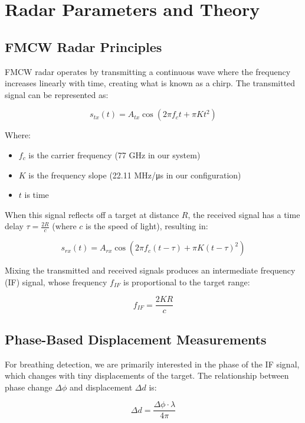 \documentclass[12pt]{article}
\begin{document}
\section{Radar Parameters and Theory}

\subsection{FMCW Radar Principles}
FMCW radar operates by transmitting a continuous wave where the frequency increases linearly with time, creating what is known as a chirp. The transmitted signal can be represented as:

\begin{equation}
s_{tx}(t) = A_{tx}\cos\left(2\pi f_c t + \pi K t^2\right)
\end{equation}

Where:
\begin{itemize}
    \item $f_c$ is the carrier frequency (77 GHz in our system)
    \item $K$ is the frequency slope (22.11 MHz/μs in our configuration)
    \item $t$ is time
\end{itemize}

When this signal reflects off a target at distance $R$, the received signal has a time delay $\tau = \frac{2R}{c}$ (where $c$ is the speed of light), resulting in:

\begin{equation}
s_{rx}(t) = A_{rx}\cos\left(2\pi f_c (t-\tau) + \pi K (t-\tau)^2\right)
\end{equation}

Mixing the transmitted and received signals produces an intermediate frequency (IF) signal, whose frequency $f_{IF}$ is proportional to the target range:

\begin{equation}
f_{IF} = \frac{2KR}{c}
\end{equation}

\subsection{Phase-Based Displacement Measurements}
For breathing detection, we are primarily interested in the phase of the IF signal, which changes with tiny displacements of the target. The relationship between phase change $\Delta\phi$ and displacement $\Delta d$ is:

\begin{equation}
\Delta d = \frac{\Delta\phi \cdot \lambda}{4\pi}
\end{equation}
\end{document}
